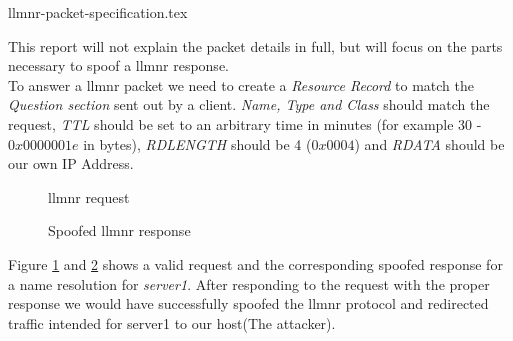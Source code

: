 \documentclass{article}
\begin{document}
{llmnr-packet-specification.tex}

This report will not explain the packet details in full, but will focus on the parts necessary to spoof a \gls{llmnr} response.\\
To answer a \gls{llmnr} packet we need to create a \emph{Resource Record} to match the \emph{Question section} sent out by a client. \emph{Name, Type and Class} should match the request, \emph{TTL} should be set to an arbitrary time in minutes (for example 30 - $0x0000001e$ in bytes), \emph{RDLENGTH} should be 4 ($0x0004$) and \emph{RDATA} should be our own IP Address.

\begin{figure}[H]
	\scriptsize
	\par
	\centering
	\varwidth{\linewidth}
	
	\endvarwidth
    \par
    
    \caption{\gls{llmnr} request}
    \label{fig:llmnr-request}
\end{figure}

\begin{figure}[H]
	\scriptsize
	\par
	\centering
	\varwidth{\linewidth}
	
	\endvarwidth
    \par
    
    \caption{Spoofed \gls{llmnr} response}
    \label{fig:llmnr-response}
\end{figure}

Figure \ref{fig:llmnr-request} and \ref{fig:llmnr-response} shows a valid request and the corresponding spoofed response for a name resolution for \emph{server1}. After responding to the request with the proper response we would have successfully spoofed the \gls{llmnr} protocol and redirected traffic intended for server1 to our host(The attacker).
\end{document}
